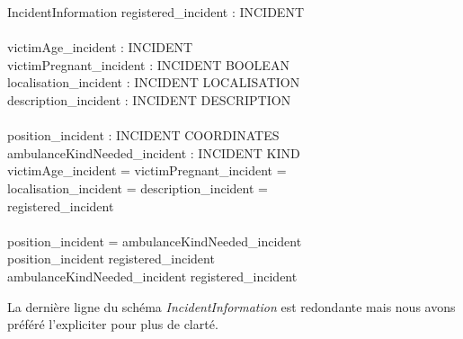 \documentclass{report}
\begin{document}
\begin{schema}{IncidentInformation}
	registered\_incident : \power INCIDENT \\
	\newline \\
	victimAge\_incident : INCIDENT \pfun \nat \\
	victimPregnant\_incident : INCIDENT \pfun BOOLEAN \\
	localisation\_incident : INCIDENT \pfun LOCALISATION \\
	description\_incident : INCIDENT \pfun DESCRIPTION \\
	\newline \\
	position\_incident : INCIDENT \pfun COORDINATES \\
	ambulanceKindNeeded\_incident : INCIDENT \pfun KIND \\
  \where
  	\dom victimAge\_incident = \dom victimPregnant\_incident =\\
	 \dom localisation\_incident = \dom description\_incident =\\
	 registered\_incident \\
	 \newline \\
	 \dom position\_incident = \dom ambulanceKindNeeded\_incident \\
	 \dom position\_incident \subseteq registered\_incident \\
	 \dom ambulanceKindNeeded\_incident  \subseteq registered\_incident \\ %
\end{schema}

La dernière ligne du schéma \textit{IncidentInformation} est redondante
mais nous avons préféré l'expliciter pour plus de clarté.
\end{document}
